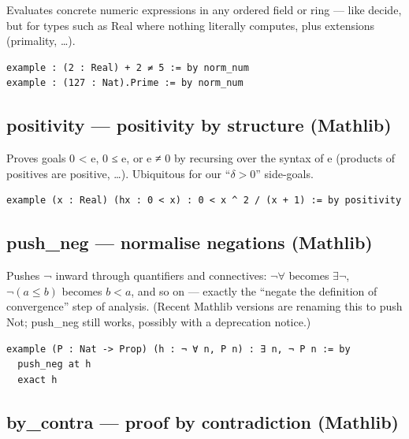 \documentclass[12pt, openany]{book}
\theoremstyle{plain}
\theoremstyle{definition}
\theoremstyle{remark}
\newcommand{\li}[1]{{\ttfamily\small\color{tealaccent}#1}}
\begin{document}
Evaluates concrete numeric expressions in any ordered field or ring --- like \li{decide}, but for types such as \li{Real} where nothing literally computes, plus extensions (primality, \ldots).

\begin{leanbox}
\begin{lstlisting}
example : (2 : Real) + 2 ≠ 5 := by norm_num
example : (127 : Nat).Prime := by norm_num
\end{lstlisting}
\end{leanbox}
\color{black}

\subsection*{\li{positivity} --- positivity by structure \textbf{(Mathlib)}}

Proves goals \li{0 < e}, \li{0 ≤ e}, or \li{e ≠ 0} by recursing over the syntax of \li{e} (products of positives are positive, \ldots).  Ubiquitous for our ``$\delta > 0$'' side-goals.

\begin{leanbox}
\begin{lstlisting}
example (x : Real) (hx : 0 < x) : 0 < x ^ 2 / (x + 1) := by positivity
\end{lstlisting}
\end{leanbox}
\color{black}

\subsection*{\li{push\_neg} --- normalise negations \textbf{(Mathlib)}}

Pushes \li{¬} inward through quantifiers and connectives: $\lnot\forall$ becomes $\exists\lnot$, $\lnot(a \leq b)$ becomes $b < a$, and so on --- exactly the ``negate the definition of convergence'' step of analysis.  (Recent Mathlib versions are renaming this to \li{push Not}; \li{push\_neg} still works, possibly with a deprecation notice.)

\begin{leanbox}
\begin{lstlisting}
example (P : Nat -> Prop) (h : ¬ ∀ n, P n) : ∃ n, ¬ P n := by
  push_neg at h
  exact h
\end{lstlisting}
\end{leanbox}
\color{black}

\subsection*{\li{by\_contra} --- proof by contradiction \textbf{(Mathlib)}}
\end{document}
